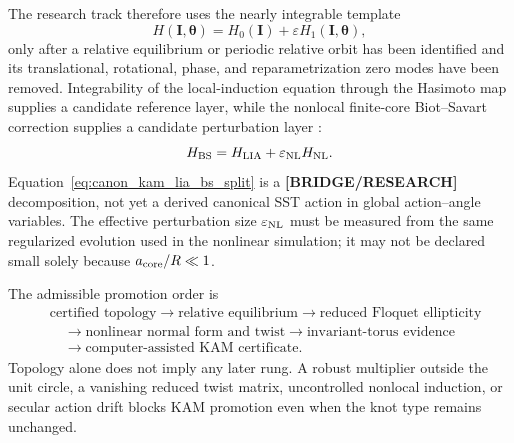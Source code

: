 \documentclass[11pt]{article}
\theoremstyle{definition}
\theoremstyle{plain}
\theoremstyle{remark}
\begin{document}
        The research track therefore uses the nearly integrable template
        \begin{equation}
            H(\mathbf I,\boldsymbol\theta)
            =
            H_0(\mathbf I)
            +
            \varepsilon H_1(\mathbf I,\boldsymbol\theta),
            \label{eq:canon_kam_nearly_integrable_template}
        \end{equation}
        only after a relative equilibrium or periodic relative orbit has been
        identified and its translational, rotational, phase, and
        reparametrization zero modes have been removed.  Integrability of the
        local-induction equation through the Hasimoto map supplies a candidate
        reference layer, while the nonlocal finite-core Biot--Savart correction
        supplies a candidate perturbation layer
        \cite{Hasimoto1972,JerrardSeis2017,MarsdenWeinstein1983}:
        \begin{equation}
            H_{\rm BS}
            =
            H_{\rm LIA}
            +
            \varepsilon_{\rm NL} H_{\rm NL}.
            \label{eq:canon_kam_lia_bs_split}
        \end{equation}
        Equation~\eqref{eq:canon_kam_lia_bs_split} is a
        \textbf{[BRIDGE/RESEARCH]} decomposition, not yet a derived canonical
        SST action in global action--angle variables.  The effective
        perturbation size \(\varepsilon_{\rm NL}\) must be measured from the
        same regularized evolution used in the nonlinear simulation; it may not
        be declared small solely because \(a_{\rm core}/R\ll1\).

        The admissible promotion order is
        \begin{align}
            &\text{certified topology}
            \longrightarrow
            \text{relative equilibrium}
            \longrightarrow
            \text{reduced Floquet ellipticity}
            \nonumber\\
            &\quad\longrightarrow
            \text{nonlinear normal form and twist}
            \longrightarrow
            \text{invariant-torus evidence}
            \nonumber\\
            &\quad\longrightarrow
            \text{computer-assisted KAM certificate}.
            \label{eq:canon_kam_promotion_ladder}
        \end{align}
        Topology alone does not imply any later rung.  A robust multiplier
        outside the unit circle, a vanishing reduced twist matrix, uncontrolled
        nonlocal induction, or secular action drift blocks KAM promotion even
        when the knot type remains unchanged.
\end{document}
